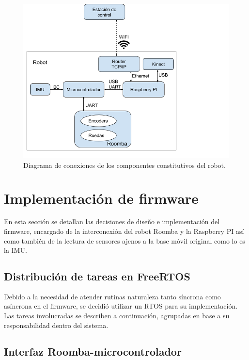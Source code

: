 \begin{figure}[ht]
  \centering
  \includegraphics[scale=0.5]{./Figures/lubobot_conexiones.png}
  \caption{Diagrama de conexiones de los componentes constitutivos del robot.}
  \label{fig:lubobotComponentes}
\end{figure}

\newpage

\section{Implementación de firmware}

En esta sección se detallan las decisiones de diseño e implementación del firmware, encargado de la interconexión del robot Roomba y la Raspberry PI así como también de la lectura de sensores ajenos a la base móvil original como lo es la IMU.

\subsection{Distribución de tareas en FreeRTOS}

Debido a la necesidad de atender rutinas naturaleza tanto síncrona como asíncrona en el firmware, se decidió utilizar un RTOS para su implementación. Las tareas involucradas se describen a continuación, agrupadas en base a su responsabilidad dentro del sistema.

\subsection{Interfaz Roomba-microcontrolador}

